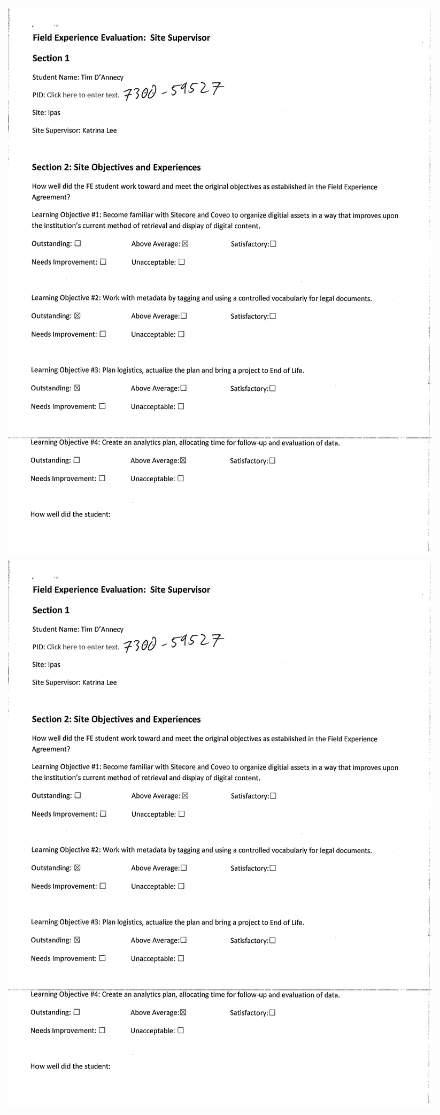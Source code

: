 \begin{figure}
  \centering
    \noindent\includegraphics[page=3,width=.45\textwidth]{documents/2016-07-28-Evaluation-Site-Supervisor}\hfill
    \noindent\includegraphics[page=4,width=.45\textwidth]{documents/2016-07-28-Evaluation-Site-Supervisor}
\end{figure}
\clearpage
